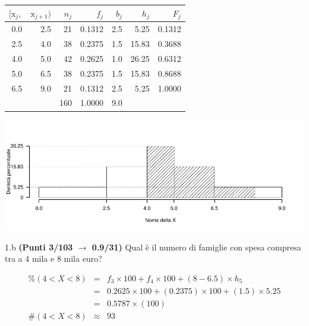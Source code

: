 \documentclass[
  11pt,
]{book}
\theoremstyle{mytheoremstyle}
\theoremstyle{mydefstyle}
\newenvironment{sol}
  {
  \begin{tcolorbox}[enhanced,breakable,arc=0.1mm,boxrule=1pt,colback=white,colframe=iblue,
  title=\bf \fontfamily{lmss}\selectfont \hspace{.5 cm} Soluzione,drop fuzzy shadow]

}{
\end{tcolorbox}
  }
\begin{document}
\begin{sol}

\begin{table}[H]
\centering
\begin{tabular}{rrrrrrr}
\toprule
$[\text{x}_j,$ & $\text{x}_{j+1})$ & $n_j$ & $f_j$ & $b_j$ & $h_j$ & $F_j$\\
\midrule
0.0 & 2.5 & 21 & 0.1312 & 2.5 & 5.25 & 0.1312\\
2.5 & 4.0 & 38 & 0.2375 & 1.5 & 15.83 & 0.3688\\
4.0 & 5.0 & 42 & 0.2625 & 1.0 & 26.25 & 0.6312\\
5.0 & 6.5 & 38 & 0.2375 & 1.5 & 15.83 & 0.8688\\
6.5 & 9.0 & 21 & 0.1312 & 2.5 & 5.25 & 1.0000\\
 &  & 160 & 1.0000 & 9.0 &  & \\
\bottomrule
\end{tabular}
\end{table}

\begin{center}\includegraphics{Esami_passati_con_soluzioni_files/figure-latex/2023-178-1} \end{center}

\end{sol}

1.b \textbf{(Punti 3/103 \(\rightarrow\) 0.9/31)} Qual è il numero di famiglie con spesa compresa tra a 4 mila e 8 mila euro?

\begin{sol}
\begin{eqnarray*} \%(4<X<8) &=&  f_{3}\times 100+ f_{ 4 }\times 100 + (8-6.5)\times h_{5}  \\ 
 &=&0.2625\times 100 + ( 0.2375 )\times 100 + (1.5)\times 5.25  \\ 
 &=&  0.5787 \times(100)\\
     \#( 4 < X < 8 ) &\approx& 93 
         \end{eqnarray*}

\end{sol}
\end{document}
